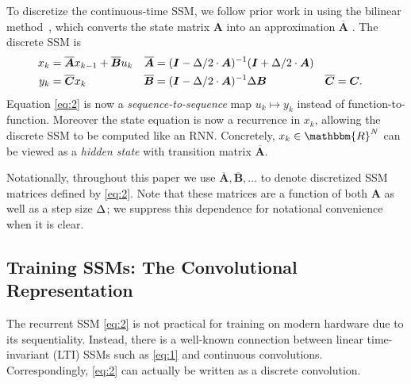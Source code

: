 To discretize the continuous-time SSM, we follow prior work in using the bilinear method~\citep{tustin1947method}, which converts the state matrix \( \bm{A} \) into an approximation \( \bm{\overline{A}} \) .
The discrete SSM is
\begin{equation}
  \label{eq:2}
\begin{aligned}
  x_{k} &= \bm{\overline{A}} x_{k-1} + \bm{\overline{B}} u_k &
  \bm{\overline{A}} &= (\bm{I} - \Delta/2 \cdot \bm{A})^{-1}(\bm{I} + \Delta/2 \cdot \bm{A}) &
  \\
  y_k &= \bm{\overline{C}} x_k &
  \bm{\overline{B}} &= (\bm{I} - \Delta/2 \cdot \bm{A})^{-1} \Delta \bm{B} &
  \bm{\overline{C}} &= \bm{C}
  .
\end{aligned}
\end{equation}
Equation \eqref{eq:2} is now a \emph{sequence-to-sequence} map \( u_k \mapsto y_k \) instead of function-to-function.
Moreover the state equation is now a recurrence in \( x_k \),
allowing the discrete SSM to be computed like an RNN.
Concretely, \( x_k \in \mathbbm{R}^N \) can be viewed as a \emph{hidden state} with transition matrix \( \bm{\overline{A}} \).

Notationally, throughout this paper we use \( \bm{\overline{A}}, \bm{\overline{B}}, \dots \) to denote discretized SSM matrices defined by \eqref{eq:2}. %
Note that these matrices are a function of both \( \bm{A} \) as well as a step size \( \Delta \); we suppress this dependence for notational convenience when it is clear.


\subsection{Training SSMs: The Convolutional Representation}
\label{sec:ss-convolution}

The recurrent SSM \eqref{eq:2} is not practical for training on modern hardware due to its sequentiality.
Instead,
there is a well-known connection between linear time-invariant (LTI) SSMs such as \eqref{eq:1} and continuous convolutions.
Correspondingly, \eqref{eq:2} can actually be written as a discrete convolution.


